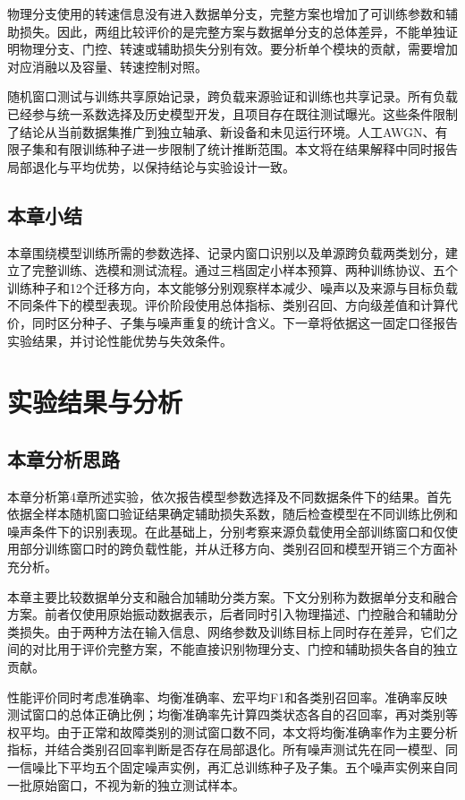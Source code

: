 \documentclass[UTF8,12pt,openany,twoside]{ctexbook}
\numberwithin{equation}{chapter}
\begin{document}
物理分支使用的转速信息没有进入数据单分支，完整方案也增加了可训练参数和辅助损失。因此，两组比较评价的是完整方案与数据单分支的总体差异，不能单独证明物理分支、门控、转速或辅助损失分别有效。要分析单个模块的贡献，需要增加对应消融以及容量、转速控制对照。

随机窗口测试与训练共享原始记录，跨负载来源验证和训练也共享记录。所有负载已经参与统一系数选择及历史模型开发，且项目存在既往测试曝光。这些条件限制了结论从当前数据集推广到独立轴承、新设备和未见运行环境。人工AWGN、有限子集和有限训练种子进一步限制了统计推断范围。本文将在结果解释中同时报告局部退化与平均优势，以保持结论与实验设计一致。

\section{本章小结}\label{ux672cux7ae0ux5c0fux7ed3-2}

本章围绕模型训练所需的参数选择、记录内窗口识别以及单源跨负载两类划分，建立了完整训练、选模和测试流程。通过三档固定小样本预算、两种训练协议、五个训练种子和12个迁移方向，本文能够分别观察样本减少、噪声以及来源与目标负载不同条件下的模型表现。评价阶段使用总体指标、类别召回、方向级差值和计算代价，同时区分种子、子集与噪声重复的统计含义。下一章将依据这一固定口径报告实验结果，并讨论性能优势与失效条件。

\chapter{实验结果与分析}\label{ux7b2c5ux7ae0-ux5b9eux9a8cux7ed3ux679cux4e0eux5206ux6790}

\section{本章分析思路}\label{ux672cux7ae0ux5206ux6790ux601dux8def}

本章分析第4章所述实验，依次报告模型参数选择及不同数据条件下的结果。首先依据全样本随机窗口验证结果确定辅助损失系数，随后检查模型在不同训练比例和噪声条件下的识别表现。在此基础上，分别考察来源负载使用全部训练窗口和仅使用部分训练窗口时的跨负载性能，并从迁移方向、类别召回和模型开销三个方面补充分析。

本章主要比较数据单分支和融合加辅助分类方案。下文分别称为数据单分支和融合方案。前者仅使用原始振动数据表示，后者同时引入物理描述、门控融合和辅助分类损失。由于两种方法在输入信息、网络参数及训练目标上同时存在差异，它们之间的对比用于评价完整方案，不能直接识别物理分支、门控和辅助损失各自的独立贡献。

性能评价同时考虑准确率、均衡准确率、宏平均F1和各类别召回率。准确率反映测试窗口的总体正确比例；均衡准确率先计算四类状态各自的召回率，再对类别等权平均。由于正常和故障类别的测试窗口数不同，本文将均衡准确率作为主要分析指标，并结合类别召回率判断是否存在局部退化。所有噪声测试先在同一模型、同一信噪比下平均五个固定噪声实例，再汇总训练种子及子集。五个噪声实例来自同一批原始窗口，不视为新的独立测试样本。
\end{document}
